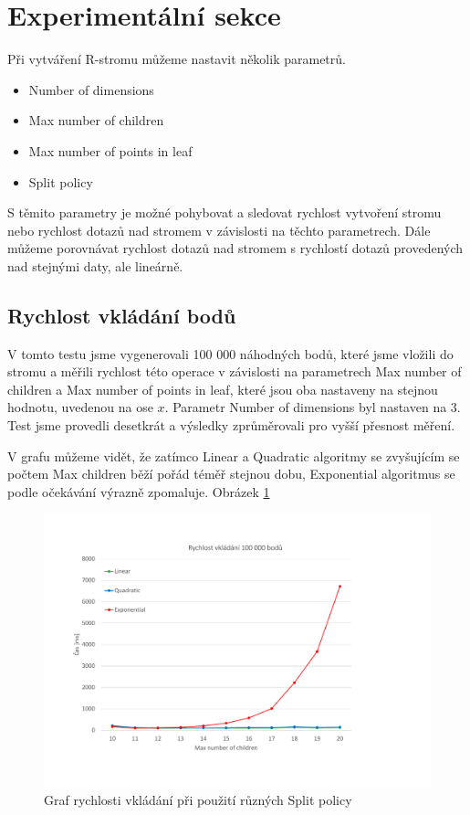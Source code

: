 \documentclass[a4paper,10pt]{article}
\begin{document}
\section{Experimentální sekce} \label{sec:exp}
Při vytváření R-stromu můžeme nastavit několik parametrů.

\begin{itemize}
	\item Number of dimensions
    \item Max number of children
    \item Max number of points in leaf
    \item Split policy
\end{itemize}

S těmito parametry je možné pohybovat a sledovat rychlost vytvoření stromu nebo rychlost dotazů nad stromem v závislosti na těchto parametrech. Dále můžeme porovnávat rychlost dotazů nad stromem s rychlostí dotazů provedených nad stejnými daty, ale lineárně.

\subsection{Rychlost vkládání bodů}

V tomto testu jsme vygenerovali 100 000 náhodných bodů, které jsme vložili do stromu a měřili rychlost této operace v závislosti na parametrech Max number of children a Max number of points in leaf, které jsou oba nastaveny na stejnou hodnotu, uvedenou na ose $x$. Parametr Number of dimensions byl nastaven na 3. Test jsme provedli desetkrát a výsledky zprůměrovali pro vyšší přesnost měření.

V grafu můžeme vidět, že zatímco Linear a Quadratic algoritmy se zvyšujícím se počtem Max children běží pořád téměř stejnou dobu, Exponential algoritmus se podle očekávání výrazně zpomaluje. Obrázek \ref{fig:insert}

\begin{figure}
    \includegraphics[width=\textwidth]{Insert.pdf}
    \caption{Graf rychlosti vkládání při použití různých Split policy}
    \label{fig:insert}
\end{figure}
\end{document}
